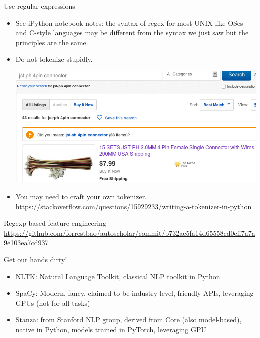 \documentclass[11pt, handout]{beamer}
\begin{document}
\begin{frame}{Use regular expressions}
\begin{itemize}
 \item  See iPython notebook notes: the syntax of regex for most UNIX-like OSes and C-style languages may be different from the syntax we just saw but the principles are the same. 
 \item Do not tokenize stupidly.
 
 \includegraphics[width=.9\textwidth]{ebay_connector.png}
 \item You may need to craft your own tokenizer. \url{https://stackoverflow.com/questions/15929233/writing-a-tokenizer-in-python}
\end{itemize}
\end{frame}

\begin{frame}{Regexp-based feature engineering}
 \url{https://github.com/forrestbao/autoscholar/commit/b732ae5fa14d65558cd0eff7a7a9e103ea7cd937}
\end{frame}

\begin{frame}{Get our hands dirty!}
  \begin{itemize}
    \item NLTK: Natural Language Toolkit, classical NLP toolkit in Python
    \item SpaCy: Modern, fancy, claimed to be industry-level, friendly APIs, leveraging GPUs (not for all tasks)
    \item Stanza: from Stanford NLP group, derived from Core (also model-based), native in Python, models trained in PyTorch, leveraging GPU
  \end{itemize}
\end{frame}
\end{document}
